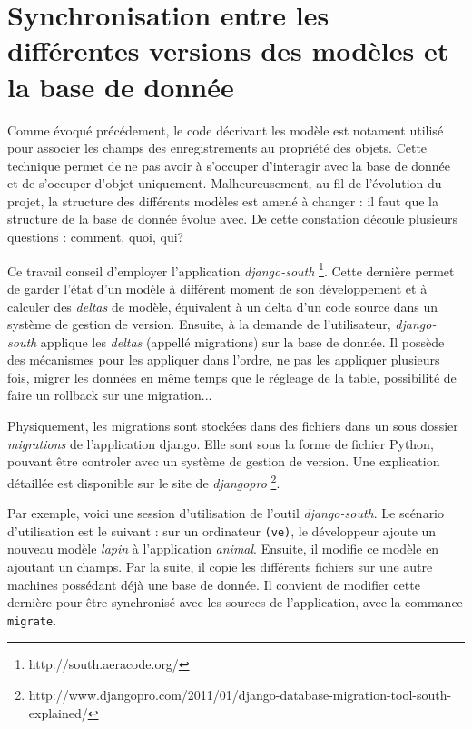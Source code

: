 \documentclass[a4paper,12pt]{article}
\begin{document}
\section{Synchronisation entre les différentes versions des modèles
         et la base de donnée}

Comme évoqué précédement, le code décrivant les
modèle est notament utilisé pour associer les champs des enregistrements
au propriété des objets. Cette technique permet de ne pas avoir
à s'occuper d'interagir avec la base de donnée et de s'occuper d'objet uniquement.
Malheureusement, au fil de l'évolution du projet, la structure des différents modèles
est amené à changer : il faut que la structure de la base de donnée évolue avec.
De cette constation découle plusieurs questions : comment, quoi, qui?

Ce travail conseil d'employer l'application \textit{django-south}
\footnote{http://south.aeracode.org/}. Cette dernière permet de garder l'état d'un modèle
à différent moment de son développement et à calculer des \textit{deltas} de modèle, équivalent
à un delta d'un code source dans un système de gestion de version. Ensuite,
à la demande de l'utilisateur, \textit{django-south} applique les \textit{deltas}
(appellé migrations) sur la base de donnée. Il possède des mécanismes pour les
appliquer dans l'ordre, ne pas les appliquer plusieurs fois, migrer les
données en même temps que le régleage de la table, possibilité de faire un rollback
sur une migration...

Physiquement, les migrations sont stockées dans des fichiers dans un sous dossier
\textit{migrations} de l'application django. Elle sont sous la forme de fichier
Python, pouvant être controler avec un système de gestion de version. Une explication
détaillée est disponible sur le site de \textit{djangopro}
\footnote{http://www.djangopro.com/2011/01/django-database-migration-tool-south-explained/}.

Par exemple, voici une session d'utilisation de l'outil \textit{django-south}.
Le scénario d'utilisation est le suivant : sur un ordinateur \texttt{(ve)}, le développeur
ajoute un nouveau modèle \textit{lapin} à l'application \textit{animal}. Ensuite,
il modifie ce modèle en ajoutant un champs. Par la suite, il copie les différents
fichiers sur une autre machines possédant déjà une base de donnée. Il convient de
modifier cette dernière pour être synchronisé avec les sources de l'application,
avec la commance \texttt{migrate}.
\end{document}
